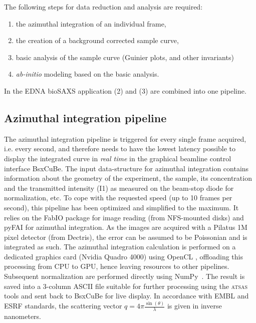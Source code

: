 \documentclass[preprint,pdf]{iucr}              %
\begin{document}
The following steps for data reduction and analysis are required:
\begin{enumerate}
\item the azimuthal integration of an individual frame,
\item the creation of a background corrected sample curve,
\item basic analysis of the sample curve (Guinier plots, and other invariants)
\item \textit{ab-initio} modeling based on the basic analysis.
\end{enumerate}
In the EDNA bioSAXS application (2) and (3) are combined into one pipeline.

\subsection{Azimuthal integration pipeline}
\label{AI}
The azimuthal integration pipeline is triggered for every single frame acquired, i.e. every second,
and therefore needs to have the lowest latency possible to display the integrated curve
in \textit{real time} in the graphical beamline control interface BsxCuBe.
The input data-structure for azimuthal integration contains
information about the geometry of the experiment, the sample, its concentration
and the transmitted intensity (I1) as measured on the beam-stop diode for
normalization, etc.
To cope with the requested speed (up to 10 frames per second), this pipeline
has been optimized and simplified to the maximum.
It relies on the FabIO \cite{fabio} package for image reading (from NFS-mounted
disks) and pyFAI \cite{pyFAI} for azimuthal integration.
As the images are acquired with a Pilatus 1M pixel detector (from Dectris), the
error can be assumed to be Poissonian and is integrated as such.
The azimuthal integration calculation is performed on a dedicated graphics card
(Nvidia Quadro 4000) using OpenCL \cite{pyFAI_gpu}, offloading this processing
from CPU to GPU, hence leaving resources to other pipelines.
Subsequent normalization are performed directly using NumPy~\cite{numpy}.
The result is saved into a 3-column ASCII file suitable for further processing
using the \textsc{atsas} tools \cite{ATSAS2} and sent back to BsxCuBe for
live display.
In accordance with EMBL and ESRF standards, the scattering vector
$q=4\pi\frac{\sin(\theta)}{\lambda}$ is given in inverse nanometers.
\end{document}
